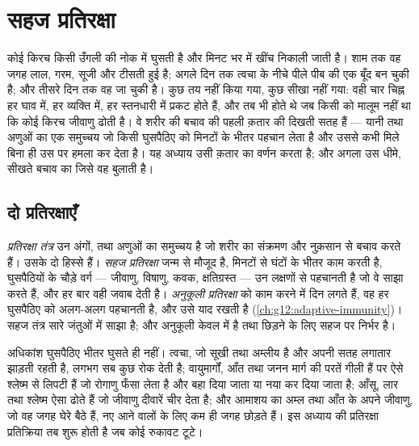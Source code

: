 \chapter{सहज प्रतिरक्षा}\label{ch:g12:innate-immunity}

कोई किरच किसी उँगली की नोक में घुसती है और मिनट भर में खींच निकाली जाती है।
शाम तक वह जगह लाल, गरम, सूजी और टीसती हुई है; अगले दिन तक त्वचा के नीचे पीले
पीब की एक बूँद बन चुकी है; और तीसरे दिन तक वह जा चुकी है। कुछ तय नहीं किया
गया, कुछ सीखा नहीं गया: वही चार चिह्न हर घाव में, हर व्यक्ति में, हर
स्तनधारी में प्रकट होते हैं, और तब भी होते थे जब किसी को मालूम नहीं था कि
कोई किरच जीवाणु ढोती है। वे शरीर की बचाव की पहली क़तार की दिखती सतह हैं ---
यानी  तथा अणुओं का एक समुच्चय जो किसी घुसपैठिए को मिनटों के भीतर
पहचान लेता है और उससे कभी मिले बिना ही उस पर हमला कर देता है। यह अध्याय उसी
क़तार का वर्णन करता है; और अगला उस धीमे, सीखते बचाव का जिसे वह बुलाती है।

\section{दो प्रतिरक्षाएँ}

\begin{definition}[सहज और अनुकूली प्रतिरक्षा]\label{def:g12:innate-immunity:immunity}
\emph{प्रतिरक्षा तंत्र} उन अंगों,  तथा
अणुओं का समुच्चय है जो शरीर का संक्रमण और नुक़सान से बचाव करते हैं। उसके दो
हिस्से हैं। \emph{सहज प्रतिरक्षा} जन्म से मौजूद है,
मिनटों से घंटों के भीतर काम करती है, घुसपैठियों के चौड़े वर्ग --- जीवाणु,
विषाणु, कवक, क्षतिग्रस्त  --- उन लक्षणों से पहचानती है जो वे साझा
करते हैं, और हर बार वही जवाब देती है।
\emph{अनुकूली प्रतिरक्षा} को काम करने में दिन
लगते हैं, वह हर घुसपैठिए को अलग-अलग पहचानती है, और उसे याद रखती है
(\cref{ch:g12:adaptive-immunity})। सहज तंत्र सारे जंतुओं में साझा है; और
अनुकूली केवल  में है तथा छिड़ने के लिए सहज पर निर्भर है।
\end{definition}

\begin{proposition}[पहले रुकावटें]\label{prop:g12:innate-immunity:barriers}
अधिकांश घुसपैठिए भीतर घुसते ही नहीं। त्वचा, जो सूखी तथा अम्लीय है और अपनी
सतह लगातार झाड़ती रहती है, लगभग सब कुछ रोक देती है; वायुमार्गों, आँत तथा
जनन मार्ग की परतें गीली हैं पर ऐसे श्लेष्म से लिपटी हैं जो रोगाणु फँसा लेता
है और बहा दिया जाता या नया कर दिया जाता है; आँसू, लार तथा श्लेष्म ऐसा
 ढोते हैं जो जीवाणु दीवारें चीर देता है; और आमाशय का अम्ल तथा आँत के
अपने जीवाणु, जो वह जगह घेरे बैठे हैं, नए आने वालों के लिए कम ही जगह छोड़ते
हैं। इस अध्याय की प्रतिरक्षा प्रतिक्रिया तब शुरू होती है जब कोई रुकावट टूटे।
\end{proposition}
\admitted

